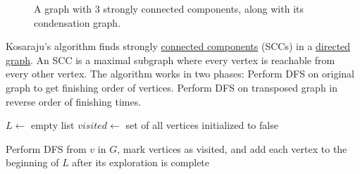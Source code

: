 \begin{figure}[H]
\begin{subfigure}[b]{0.44\textwidth}
      \caption{}
      \label{fig:}
    \end{subfigure}
    \caption{A graph with 3 strongly connected components, along with its condensation graph. } 
    \label{fig:scc_condensation}
  \end{figure}

  \begin{algo}
    Kosaraju's algorithm finds strongly \hyperref[pst-def:connected-components]{connected components} (SCCs) in a \hyperref[def:directed-graph]{directed graph}.
    An SCC is a maximal subgraph where every vertex is reachable from every other vertex.
    The algorithm works in two phases: Perform DFS on original graph to get finishing order of vertices. Perform DFS on transposed graph in reverse order of finishing times. 
    \begin{algorithm}[H]
    \caption{Kosaraju's Algorithm for Strongly Connected Components}
    \label{alg:kosaraju}
    \begin{algorithmic}[1]
    
        
        \State $L \gets $ empty list 
        \State $visited \gets $ set of all vertices initialized to false 
        
         
           
            \State Perform DFS from $v$ in $G$, mark vertices as visited, and add each vertex to the beginning of $L$ after its exploration is complete 
          \EndIf
        \EndFor
        

\end{algorithmic}
\end{algorithm}
\end{algo}
